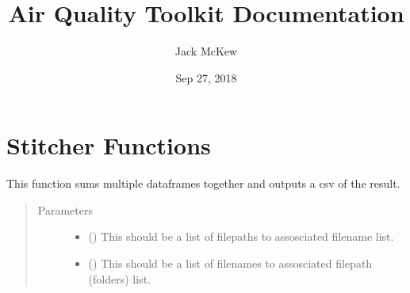 \documentclass[letterpaper,10pt,english]{sphinxmanual}
\title{Air Quality Toolkit Documentation}
\date{Sep 27, 2018}
\author{Jack McKew}
\begin{document}
\maketitle
\sphinxtableofcontents
{}\label{\detokenize{index::doc}}



\chapter{Stitcher Functions}
\label{\detokenize{index:stitcher-functions}}\label{\detokenize{index:module-StitcherFunctions}}\label{\detokenize{index:welcome-to-air-quality-toolkit-s-documentation}}

\begin{fulllineitems}
\label{\detokenize{index:StitcherFunctions.Stitcher}}
This function sums multiple dataframes together and outputs a csv of the result.
\begin{quote}\begin{description}
\item[{Parameters}] \leavevmode\begin{itemize}
\item {} 
 (\sphinxstyleliteralemphasis{\sphinxupquote{{[}}}\sphinxstyleliteralemphasis{\sphinxupquote{{]}}}\sphinxstyleliteralemphasis{\sphinxupquote{}}) \textendash{} This should be a list of filepaths to assosciated filename list.

\item {} 
 (\sphinxstyleliteralemphasis{\sphinxupquote{{[}}}\sphinxstyleliteralemphasis{\sphinxupquote{{]}}}\sphinxstyleliteralemphasis{\sphinxupquote{}}) \textendash{} This should be a list of filenames to assosciated filepath (folders) list.


\end{itemize}
\end{description}
\end{quote}
\end{fulllineitems}
\end{document}
